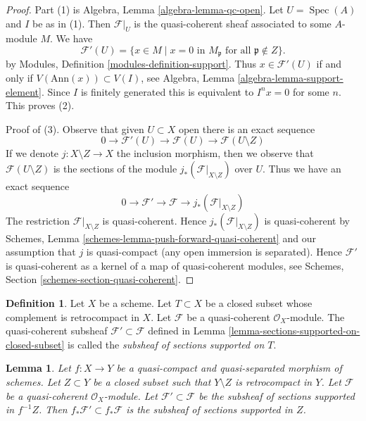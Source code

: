 \documentclass{stacks-project}
\theoremstyle{plain}
\newtheorem{lemma}[subsection]{Lemma}
\theoremstyle{definition}
\newtheorem{definition}[subsection]{Definition}
\theoremstyle{remark}
\numberwithin{equation}{subsection}
\def\Spec{\mathop{\mathrm{Spec}}}
\begin{document}
\begin{proof}
Part (1) is Algebra, Lemma \ref{algebra-lemma-qc-open}.
Let $U = \Spec(A)$ and $I$ be as in (1).
Then $\mathcal{F}|_U$ is the quasi-coherent sheaf associated to
some $A$-module $M$. We have
$$
\mathcal{F}'(U) = \{x \in M \mid x = 0\text{ in }M_\mathfrak p
\text{ for all }\mathfrak p \not \in Z\}.
$$
by Modules, Definition \ref{modules-definition-support}. Thus
$x \in \mathcal{F}'(U)$ if and only if $V(\text{Ann}(x)) \subset V(I)$, see
Algebra, Lemma \ref{algebra-lemma-support-element}. Since $I$ is
finitely generated this is equivalent to $I^n x = 0$ for some $n$.
This proves (2).

\medskip\noindent
Proof of (3). Observe that given $U \subset X$ open there is an exact sequence
$$
0 \to \mathcal{F}'(U) \to \mathcal{F}(U) \to \mathcal{F}(U \setminus Z)
$$
If we denote $j : X \setminus Z \to X$ the inclusion morphism, then
we observe that $\mathcal{F}(U \setminus Z)$ is the sections of the
module $j_*(\mathcal{F}|_{X \setminus Z})$ over $U$. Thus we have
an exact sequence
$$
0 \to \mathcal{F}' \to \mathcal{F} \to j_*(\mathcal{F}|_{X \setminus Z})
$$
The restriction $\mathcal{F}|_{X \setminus Z}$ is quasi-coherent.
Hence $j_*(\mathcal{F}|_{X \setminus Z})$ is quasi-coherent
by Schemes, Lemma \ref{schemes-lemma-push-forward-quasi-coherent}
and our assumption that $j$ is quasi-compact (any open immersion
is separated). Hence $\mathcal{F}'$ is quasi-coherent
as a kernel of a map of quasi-coherent modules, see
Schemes, Section \ref{schemes-section-quasi-coherent}.
\end{proof}

\begin{definition}
\label{definition-subsheaf-sections-supported-on-closed}
Let $X$ be a scheme.
Let $T \subset X$ be a closed subset whose complement
is retrocompact in $X$.
Let $\mathcal{F}$ be a quasi-coherent $\mathcal{O}_X$-module.
The quasi-coherent subsheaf $\mathcal{F}' \subset \mathcal{F}$ defined in
Lemma \ref{lemma-sections-supported-on-closed-subset} is called
the {\it subsheaf of sections supported on $T$}.
\end{definition}

\begin{lemma}
\label{lemma-push-sections-supported-on-closed-subset}
Let $f : X \to Y$ be a quasi-compact and quasi-separated morphism
of schemes. Let $Z \subset Y$ be a closed subset such that
$Y \setminus Z$ is retrocompact in $Y$. Let $\mathcal{F}$ be a quasi-coherent
$\mathcal{O}_X$-module. Let $\mathcal{F}' \subset \mathcal{F}$
be the subsheaf of sections supported in $f^{-1}Z$.
Then $f_*\mathcal{F}' \subset f_*\mathcal{F}$ is the subsheaf
of sections supported in $Z$.
\end{lemma}
\end{document}
